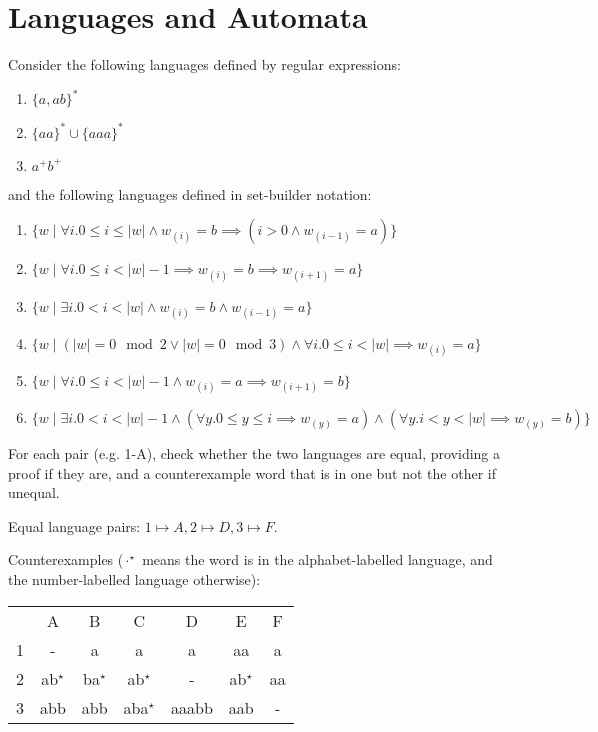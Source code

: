 
\section{Languages and Automata}

\begin{exercise}{}

  Consider the following languages defined by regular expressions:
  
  \begin{enumerate}
    \item \(\{a,ab\}^*\)
    \item \(\{aa\}^* \cup \{aaa\}^*\)
    \item \(a^+b^+\)
  \end{enumerate}

  and the following languages defined in set-builder notation:

  \begin{enumerate}
    \renewcommand{\theenumi}{\Alph{enumi}}
    \item \(\{w \mid \forall i. 0 \le i \le |w| \land w_{(i)} = b \implies (i > 0 \land w_{(i - 1)} = a)\}\) %
    \item \(\{w \mid \forall i. 0 \le i < |w| - 1 \implies w_{(i)} = b \implies w_{(i + 1)} = a\}\) %
    \item \(\{w \mid \exists i. 0 < i < |w| \land w_{(i)} = b \land w_{(i - 1)} = a\}\) %
    \item \(\{w \mid (|w| = 0 \mod 2 \lor |w| = 0 \mod 3) \land \forall i. 0 \leq i < |w| \implies w_{(i)} = a\}\) %
    \item \(\{w \mid \forall i. 0 \le i < |w| - 1 \land w_{(i)} = a \implies w_{(i + 1)} = b\}\) %
    \item \(\{w \mid \exists i. 0 < i < |w| - 1 \land 
    (\forall y. 0 \leq y \leq i \implies w_{(y)} = a) \land  (\forall y. i < y < |w| \implies w_{(y)} = b) \}\) %
  \end{enumerate}

  For each pair (e.g. 1-A), check whether the two languages are equal, providing
  a proof if they are, and a counterexample word that is in one but not the
  other if unequal.

  \begin{solution}

    Equal language pairs: \(1 \mapsto A, 2 \mapsto D, 3 \mapsto F\).

    Counterexamples (\(\cdot^\star\) means the word is in the alphabet-labelled
    language, and the number-labelled language otherwise):
    \begin{center}
      \begin{tabular}{c c c c c c c}
        & A & B & C & D & E & F \\
        1 & - & a & a & a & aa & a \\
        2 & ab\(^\star\) & ba\(^\star\)& ab\(^\star\)& - & ab\(^\star\)& aa \\
        3 & abb & abb & aba\(^\star\) & aaabb & aab & - \\
      \end{tabular}
    \end{center}


\end{solution}
\end{exercise}
